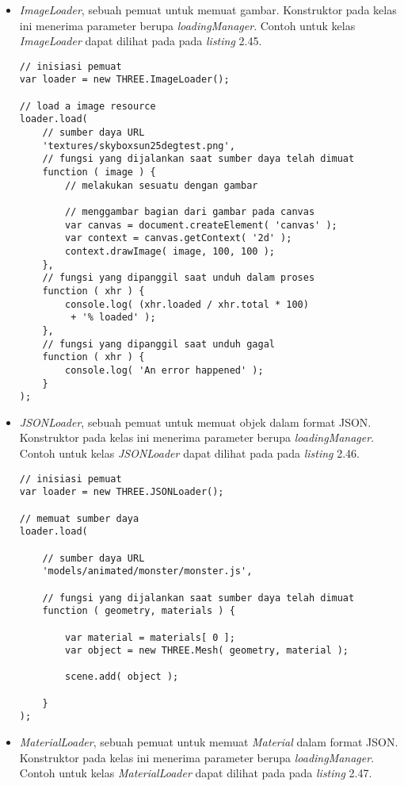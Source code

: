 \begin{itemize}
\begin{itemize}
	\item {\it ImageLoader}, sebuah pemuat untuk memuat gambar. Konstruktor pada kelas ini menerima parameter berupa  {\it loadingManager}. Contoh untuk kelas {\it ImageLoader} dapat dilihat pada pada {\it listing} 2.45.
	
\begin{lstlisting}[caption={Contoh penggunaan kelas {\it ImageLoader}.},captionpos=b]
// inisiasi pemuat
var loader = new THREE.ImageLoader();

// load a image resource
loader.load(
	// sumber daya URL
	'textures/skyboxsun25degtest.png',
	// fungsi yang dijalankan saat sumber daya telah dimuat
	function ( image ) {
		// melakukan sesuatu dengan gambar

		// menggambar bagian dari gambar pada canvas
		var canvas = document.createElement( 'canvas' );
		var context = canvas.getContext( '2d' );
		context.drawImage( image, 100, 100 );
	},
	// fungsi yang dipanggil saat unduh dalam proses
	function ( xhr ) {
		console.log( (xhr.loaded / xhr.total * 100)
		 + '% loaded' );
	},
	// fungsi yang dipanggil saat unduh gagal
	function ( xhr ) {
		console.log( 'An error happened' );
	}
);
\end{lstlisting}

	\item {\it JSONLoader}, sebuah pemuat untuk memuat objek dalam format JSON. Konstruktor pada kelas ini menerima parameter berupa  {\it loadingManager}. Contoh untuk kelas {\it JSONLoader} dapat dilihat pada pada {\it listing} 2.46.
	
\begin{lstlisting}[caption={Contoh penggunaan kelas {\it JSONLoader}.},captionpos=b]
// inisiasi pemuat
var loader = new THREE.JSONLoader();

// memuat sumber daya
loader.load(

	// sumber daya URL
	'models/animated/monster/monster.js',

	// fungsi yang dijalankan saat sumber daya telah dimuat
	function ( geometry, materials ) {

		var material = materials[ 0 ];
		var object = new THREE.Mesh( geometry, material );

		scene.add( object );

	}
);
\end{lstlisting}
	
	\item {\it MaterialLoader}, sebuah pemuat untuk memuat {\it Material} dalam format JSON. Konstruktor pada kelas ini menerima parameter berupa  {\it loadingManager}. Contoh untuk kelas {\it MaterialLoader} dapat dilihat pada pada {\it listing} 2.47.
	

\end{itemize}
\end{itemize}
